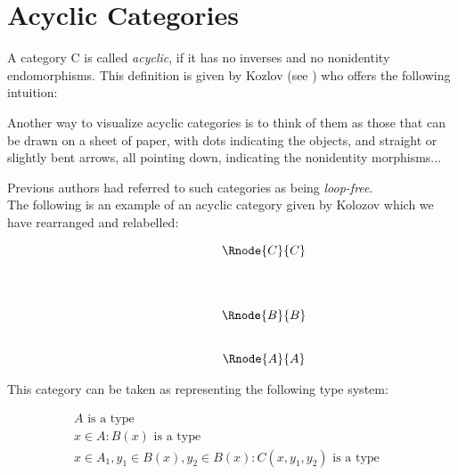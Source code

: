 \documentclass[10pt,a4paper]{scrartcl}
\begin{document}
\section {Acyclic Categories}
A category C is called \textit{acyclic}, if it has no inverses and no nonidentity
endomorphisms. This definition is given by Kozlov (see \cite{Kozlov2007}) who offers the following intuition:
\begin{erquote}
Another way to visualize acyclic categories is to think of them as those
that can be drawn on a sheet of paper, with dots indicating the objects, and
straight or slightly bent arrows, all pointing down, indicating the nonidentity
morphisms...
\end{erquote}

\noindent
Previous authors had referred to such categories as being \textit{loop-free}. \\

\noindent
The following is an example of an acyclic category given by Kolozov which we have rearranged and relabelled:

\begin{center}
\begin{equation}
\begin{array}{p{1.5cm}cccp{2cm}c}
&                & \Rnode{C}{C}&   \\ [1.4cm]
&                & \Rnode{B}{B} &  \\ [0.8cm]
&                & \Rnode{A}{A} &  
\end{array}
\end{equation}
\setlength {\saroffsetA}{-2pt}
\setlength {\saroffsetB}{-2pt}
\sarreset
\end{center}


\noindent This category can be taken as representing the following type system:
\addtocounter{equation}{-1}
\begin{align}
&A\mbox{ is a type} && \tag*{(\theequation a)}\\
&x\in A: B(x) \mbox{ is a type} && \tag*{(\theequation b)}\\
&x\in A_1, y_1 \in B(x), y_2 \in B(x) : C(x,y_1,y_2) \mbox{ is a type} && \tag*{(\theequation c)}
\end{align}
\end{document}

